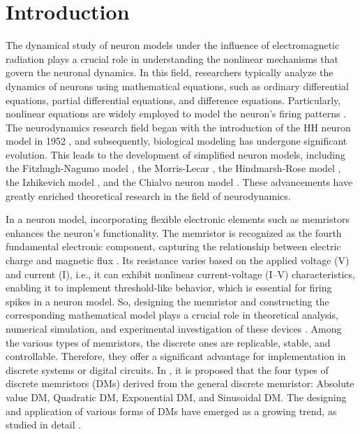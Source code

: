 \documentclass{article}
\begin{document}
\section{Introduction}
The dynamical study of neuron models under the influence of electromagnetic radiation plays a crucial role in understanding the nonlinear mechanisms that govern the neuronal dynamics. In this field, researchers typically analyze the dynamics of neurons using mathematical equations, such as ordinary differential equations, partial differential equations, and difference equations. Particularly, nonlinear equations are widely employed to model the neuron's firing patterns \cite{izhikevich2000neural}. The neurodynamics research field began with the introduction of the HH neuron model in 1952 \cite{hodgkin1952quantitative}, and subsequently, biological modeling has undergone significant evolution. This leads to the development of simplified neuron models, including the Fitzhugh-Nagumo model \cite{fitzhugh1955mathematical}, the Morris-Lecar \cite{morris1981voltage}, the Hindmarsh-Rose model \cite{hindmarsh1984model}, the Izhikevich model \cite{izhikevich2007dynamical}, and the Chialvo neuron model \cite{chialvo1995generic}. These advancements have greatly enriched theoretical research in the field of neurodynamics.

In a neuron model, incorporating flexible electronic elements such as memristors enhances the neuron's functionality. The memristor is recognized as the fourth fundamental electronic component, capturing the relationship between electric charge and magnetic flux \cite{chua2003memristor}. Its resistance varies based on the applied voltage (V) and current (I), i.e., it can exhibit nonlinear current-voltage (I–V) characteristics, enabling it to implement threshold-like behavior, which is essential for firing spikes in a neuron model. So, designing the memristor and constructing the corresponding mathematical model plays a crucial role in theoretical analysis, numerical simulation, and experimental investigation of these devices \cite{cao2024discrete,wang2025spatiotemporal}. Among the various types of memristors, the discrete ones are replicable, stable, and controllable. Therefore, they offer a significant advantage for implementation in discrete systems or digital circuits. In \cite{bao2021discrete}, it is proposed that the four types of discrete memristors (DMs) derived from the general discrete memristor: Absolute value DM, Quadratic DM, Exponential DM, and Sinusoidal DM. The designing and application of various forms of DMs have emerged as a growing trend, as studied in detail \cite{peng2020discrete,yu2022dynamic,chen2023new,xu2024dynamical,wang2025complex}. 
\end{document}
